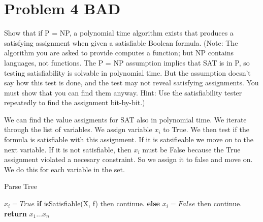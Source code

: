 \documentclass[11pt]{article}
\begin{document}
\newpage
\section*{Problem 4 BAD}

Show that if P = NP, a polynomial time algorithm exists that produces a satisfying
assignment when given a satisfiable Boolean formula. (Note: The algorithm you
are asked to provide computes a function; but NP contains languages, not functions. The P = NP assumption implies that SAT is in P, so testing satisfiability is
solvable in polynomial time. But the assumption doesn’t say how this test is done,
and the test may not reveal satisfying assignments. You must show that you can find
them anyway. Hint: Use the satisfiability tester repeatedly to find the assignment
bit-by-bit.)




We can find the value assigments for SAT also in polynomial time. We iterate through the list of variables. We assign variable $x_i$ to True. We then test if the formula is satisfiable with this assignment. If it is satsifieable we move on to the next variable. If it is not satisfiable, then $x_i$ must be False because the True assignment violated a necesary constraint. So we assign it to false and move on. We do this for each variable in the set. 

\begin{algorithm}
    \caption{Parse Tree}\label{guests}
    \begin{algorithmic}[1]
			\State $x_i = True$
			\State \textbf{if} isSatisfiable(X, f) then continue.
			\State \textbf{else} $x_i = False$ then continue.
		\EndFor
       \State \textbf{return} $x_1 ... x_n$
    \EndFunction
    \end{algorithmic}
\end{algorithm}
\end{document}
